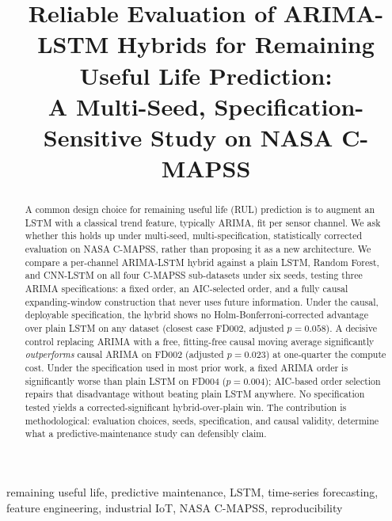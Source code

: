 \documentclass[conference]{IEEEtran}
\newif\ifblind
\begin{document}
\title{Reliable Evaluation of ARIMA-LSTM Hybrids for Remaining Useful Life Prediction: \\ A Multi-Seed, Specification-Sensitive Study on NASA C-MAPSS}

\author{
\ifblind
\IEEEauthorblockN{Anonymous Author(s)}
\IEEEauthorblockA{Affiliation withheld for blind review}
\else
{}
\fi
}

\maketitle

\begin{abstract}
A common design choice for remaining useful life (RUL) prediction is to augment an LSTM with a classical trend feature, typically ARIMA, fit per sensor channel. We ask whether this holds up under multi-seed, multi-specification, statistically corrected evaluation on NASA C-MAPSS, rather than proposing it as a new architecture. We compare a per-channel ARIMA-LSTM hybrid against a plain LSTM, Random Forest, and CNN-LSTM on all four C-MAPSS sub-datasets under six seeds, testing three ARIMA specifications: a fixed order, an AIC-selected order, and a fully causal expanding-window construction that never uses future information. Under the causal, deployable specification, the hybrid shows no Holm-Bonferroni-corrected advantage over plain LSTM on any dataset (closest case FD002, adjusted $p=0.058$). A decisive control replacing ARIMA with a free, fitting-free causal moving average significantly \emph{outperforms} causal ARIMA on FD002 (adjusted $p=0.023$) at one-quarter the compute cost. Under the specification used in most prior work, a fixed ARIMA order is significantly worse than plain LSTM on FD004 ($p=0.004$); AIC-based order selection repairs that disadvantage without beating plain LSTM anywhere. No specification tested yields a corrected-significant hybrid-over-plain win. The contribution is methodological: evaluation choices, seeds, specification, and causal validity, determine what a predictive-maintenance study can defensibly claim.
\end{abstract}

\begin{IEEEkeywords}
remaining useful life, predictive maintenance, LSTM, time-series forecasting, feature engineering, industrial IoT, NASA C-MAPSS, reproducibility
\end{IEEEkeywords}
\end{document}
